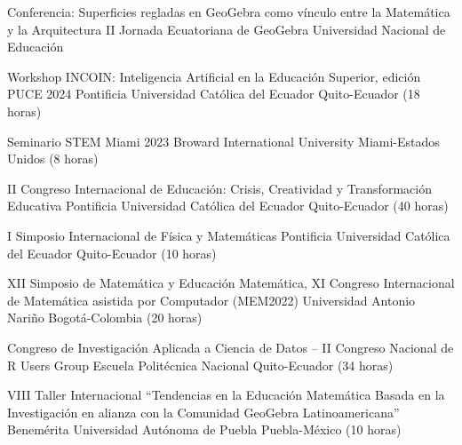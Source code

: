 \documentclass[
	a4paper,
	maincolor=cvblue!70!blue,
	sidecolor=gray!30,
	sectioncolor=cvblue!70!blue,
    sidebarwidth=7.5cm,
	topbottommargin=20pt,
	leftrightmargin=20pt,
]{fortysecondscv}
\begin{document}
    {Conferencia: Superficies regladas en GeoGebra como vínculo entre la Matemática y la Arquitectura}
    {II Jornada Ecuatoriana de GeoGebra}
    {Universidad Nacional de Educación}
    

    

    
    

    
    {Workshop INCOIN: Inteligencia Artificial en la Educación Superior, edición PUCE 2024}
    {Pontificia Universidad Católica del Ecuador}
    {Quito-Ecuador (18 horas)}
    
    {Seminario STEM Miami 2023}
    {Broward International University}
    {Miami-Estados Unidos (8 horas)}

    {II Congreso Internacional de Educación: Crisis, Creatividad y Transformación Educativa}
    {Pontificia Universidad Católica del Ecuador}
    {Quito-Ecuador (40 horas)}

    {I Simposio Internacional de Física y Matemáticas}
    {Pontificia Universidad Católica del Ecuador}
    {Quito-Ecuador (10 horas)}

    {XII Simposio de Matemática y Educación Matemática, XI Congreso Internacional de Matemática asistida por Computador (MEM2022)}
    {Universidad Antonio Nariño}
    {Bogotá-Colombia (20 horas)}

    {Congreso de Investigación Aplicada a Ciencia de Datos – II Congreso Nacional de R Users Group}
    {Escuela Politécnica Nacional}
    {Quito-Ecuador (34 horas)}

    {VIII Taller Internacional “Tendencias en la Educación Matemática Basada en la Investigación en alianza con la Comunidad GeoGebra Latinoamericana”}
    {Benemérita Universidad Autónoma de Puebla}
    {Puebla-México (10 horas)}
\end{document}
